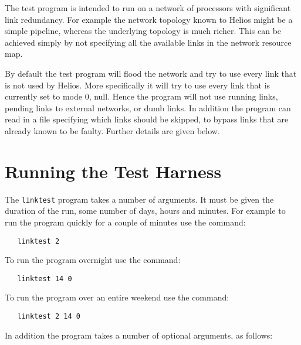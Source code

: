 The test program is intended to run on a network of processors with
significant link redundancy. For example the network topology known
to Helios might be a simple pipeline, whereas the underlying topology
is much richer. This can be achieved simply by not specifying
all the available links in the network resource map.

By default the test program will flood the network and try to use
every link that is not used by Helios. More specifically it will
try to use every link that is currently set to mode 0, null. Hence
the program will not use running links, pending links to external
networks, or dumb links. In addition the program can read in a
file specifying which links should be skipped, to bypass links that are
already known to be faulty. Further details are given below.

\section{Running the Test Harness}

The {\tt linktest} program takes a number of arguments. It must be given
the duration of the run, some number of days, hours and
minutes. For example to run the program quickly for a couple of minutes
use the command:

\begin{verbatim}
   linktest 2
\end{verbatim}

To run the program overnight use the command:

\begin{verbatim}
   linktest 14 0
\end{verbatim}

To run the program over an entire weekend use the command:

\begin{verbatim}
   linktest 2 14 0
\end{verbatim}

In addition the program takes a number of optional arguments, as follows:

